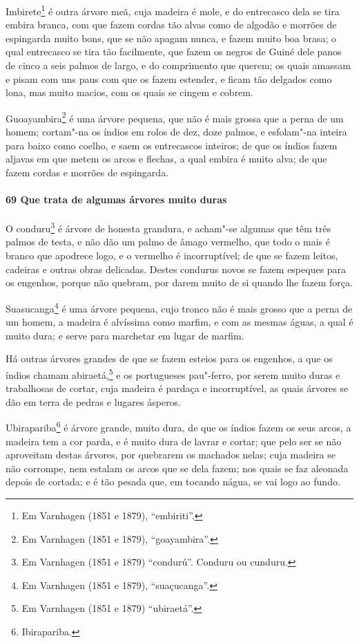 \begin{linenumbers}
Imbirete\footnote{ Em Varnhagen (1851 e 1879), ``embiriti''.} é outra árvore meã, cuja
madeira é mole, e do entrecasco dela se tira embira branca, com que fazem cordas tão alvas
como de algodão e morrões de espingarda muito bons, que se não apagam nunca, e fazem muito
boa brasa; o qual entrecasco se tira tão facilmente, que fazem os negros de Guiné dele
panos de cinco a seis palmos de largo, e do comprimento que querem; os quais amassam e
pisam com uns paus com que os fazem estender, e ficam tão delgados como lona, mas muito
macios, com os quais se cingem e cobrem.

Guoayambira\footnote{ Em Varnhagen (1851 e 1879), ``goayambira''.} é uma árvore pequena,
que não é mais grossa que a perna de um homem; cortam"-na os índios em rolos de dez, doze
palmos, e esfolam"-na inteira para baixo como coelho, e saem os entrecascos inteiros; de
que os índios fazem aljavas em que metem os arcos e flechas, a qual embira é muito alva;
de que fazem cordas e morrões de espingarda.

\paragraph{69 Que trata de algumas árvores muito duras}\quad
O conduru\footnote{ Em Varnhagen (1851 e 1879) ``condurú''. Conduru ou cunduru.} é árvore
de honesta grandura, e acham"-se algumas que têm três palmos de testa, e não dão um palmo
de âmago vermelho, que todo o mais é branco que apodrece logo, e o vermelho é
incorruptível; de que se fazem leitos, cadeiras e outras obras delicadas. Destes condurus
novos se fazem espeques para os engenhos, porque não quebram, por darem muito de si quando
lhe fazem força.

Suasucanga\footnote{ Em Varnhagen (1851 e 1879), ``suaçucanga''.} é uma árvore pequena,
cujo tronco não é mais grosso que a perna de um homem, a madeira é alvíssima como marfim,
e com as mesmas águas, a qual é muito dura; e serve para marchetar em lugar de marfim.

Há outras árvores grandes de que se fazem esteios para os engenhos, a que os índios chamam
abiraetá,\footnote{ Em Varnhagen (1851 e 1879) ``ubiraetá''.} e os portugueses pau"-ferro,
por serem muito duras e trabalhosas de cortar, cuja madeira é pardaça e incorruptível, as
quais árvores se dão em terra de pedras e lugares ásperos.

Ubirapariba\footnote{ Ibirapariba.} é árvore grande, muito dura, de que os índios fazem os
seus arcos, a madeira tem a cor parda, e é muito dura de lavrar e cortar; que pelo ser se
não aproveitam destas árvores, por quebrarem os machados nelas; cuja madeira se não
corrompe, nem estalam os arcos que se dela fazem; nos quais se faz aleonada depois de
cortada; e é tão pesada que, em tocando nágua, se vai logo ao fundo.


\end{linenumbers}
